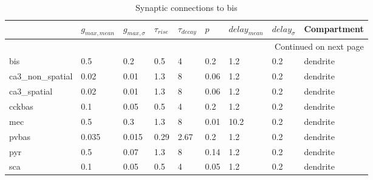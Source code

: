 \begin{longtable}{lllllllll}
\caption{Synaptic connections to bis}\label{bis_synapses}\\
\toprule
{} &   $g_{max, mean}$ & $g_{max, \sigma}$ & $\tau_{rise}$ & $\tau_{decay}$ &  $p$ & $delay_{mean}$ & $delay_{\sigma}$ & Compartment \\
\midrule
\endhead
\midrule
\multicolumn{9}{r}{{Continued on next page}} \\
\midrule
\endfoot

\bottomrule
\endlastfoot
bis             &    0.5 &      0.2 &      0.5 &         4 &   0.2 &   1.2 &       0.2 &      dendrite\ \\
ca3\_non\_spatial &   0.02 &     0.01 &      1.3 &         8 &  0.06 &   1.2 &       0.2 &      dendrite\ \\
ca3\_spatial     &   0.02 &     0.01 &      1.3 &         8 &  0.06 &   1.2 &       0.2 &      dendrite\ \\
cckbas          &    0.1 &     0.05 &      0.5 &         4 &   0.2 &   1.2 &       0.2 &      dendrite\ \\
mec             &    0.5 &      0.3 &      1.3 &         8 &  0.01 &  10.2 &       0.2 &      dendrite\ \\
pvbas           &  0.035 &    0.015 &     0.29 &      2.67 &   0.2 &   1.2 &       0.2 &      dendrite\ \\
pyr             &    0.5 &     0.07 &      1.3 &         8 &  0.14 &   1.2 &       0.2 &      dendrite\ \\
sca             &    0.1 &     0.05 &      0.5 &         4 &  0.05 &   1.2 &       0.2 &      dendrite\ \\
\end{longtable}
